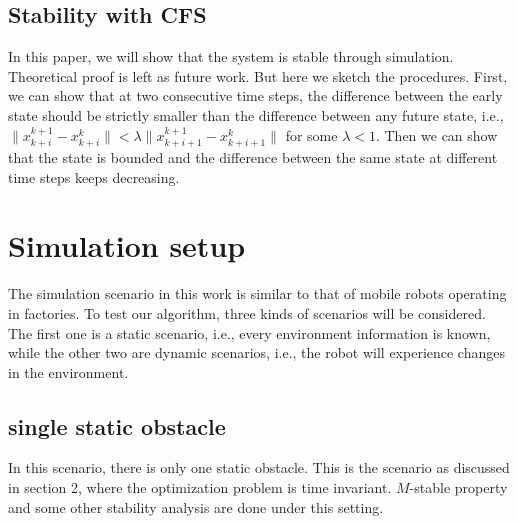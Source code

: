 \subsection{Stability with CFS}
In this paper, we will show that the system is stable through simulation. Theoretical proof is left as future work. But here we sketch the procedures. First, we can show that at two consecutive time steps, the difference between the early state should be strictly smaller than the difference between any future state, i.e., $\|x_{k+i}^{k+1}-x_{k+i}^k\|<\lambda\|x_{k+i+1}^{k+1}-x_{k+i+1}^k\|$ for some $\lambda<1$. Then we can show that the state is bounded and the difference between the same state at different time steps keeps decreasing.
%
%

\section{Simulation setup}

The simulation scenario in this work is similar to that of mobile robots operating in factories. To test our algorithm, three kinds of scenarios will be considered. The first one is a static scenario, i.e., every environment information is known, while the other two are dynamic scenarios, i.e., the robot will experience changes in the environment.

\subsection{single static obstacle}
In this scenario, there is  only one static obstacle. This is the scenario as discussed in section 2, where the optimization problem is time invariant. $M$-stable property and some other stability analysis are done under this setting.

